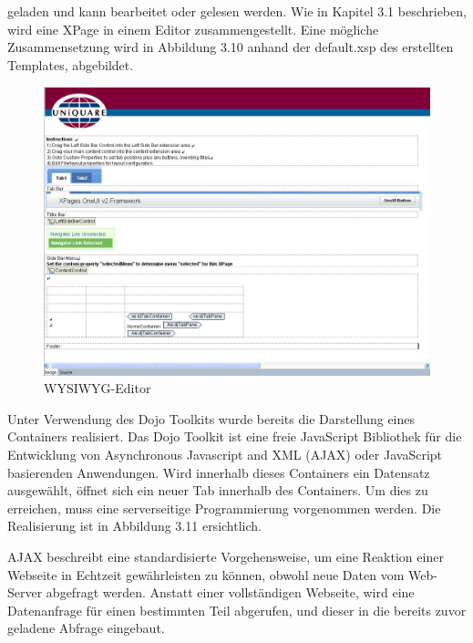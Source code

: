 geladen und kann bearbeitet oder gelesen werden.\newline
Wie in Kapitel 3.1 beschrieben, wird eine XPage in einem Editor zusammengestellt. Eine \linebreak mögliche Zusammensetzung wird in Abbildung 3.10 
anhand der default.xsp des erstellten \linebreak Templates, abgebildet.
\begin{figure}[H]
    \centerline{\includegraphics[scale=0.3]{pics/xpagesineditor}}
    \caption[XPages Editor mit default.xsp ]{\label{FiG:XPages Editor mit default.xsp}
	WYSIWYG-Editor}
\end{figure}
Unter Verwendung des Dojo Toolkits wurde bereits die Darstellung eines Containers \linebreak realisiert. Das Dojo Toolkit ist eine freie JavaScript 
Bibliothek für die Entwicklung von \linebreak Asynchronous Javascript and XML (AJAX) oder JavaScript basierenden Anwendungen. Wird innerhalb dieses
Containers ein Datensatz ausgewählt, öffnet sich ein neuer Tab innerhalb des Containers. Um dies zu erreichen, muss eine serverseitige Programmierung
vorgenommen \linebreak werden.
Die Realisierung ist in  Abbildung 3.11 ersichtlich.
\newline


AJAX beschreibt eine standardisierte Vorgehensweise, um eine Reaktion einer Webseite in Echtzeit gewährleisten zu 
können, obwohl neue Daten vom Web-Server abgefragt werden. \linebreak Anstatt einer vollständigen Webseite, wird eine Datenanfrage für einen bestimmten Teil abgerufen,
und dieser in die bereits zuvor geladene Abfrage eingebaut\cite{steyer}.

